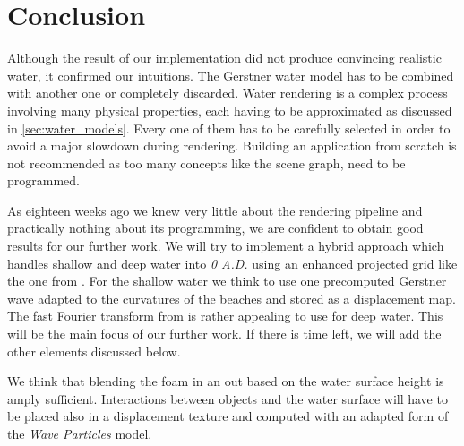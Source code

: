\section{Conclusion}\label{sec:conclusion}


Although the result of our implementation did not produce convincing realistic
water, it confirmed our intuitions. The Gerstner water model has to be combined
with another one or completely discarded. Water rendering is a complex process
involving many physical properties, each having to be approximated as discussed
in \autoref{sec:water_models}. Every one of them has to be carefully selected in
order to avoid a major slowdown during rendering. Building an application from
scratch is not recommended as too many concepts like the scene graph, need to be
programmed.

As eighteen weeks ago we knew very little about the rendering pipeline and
practically nothing about its programming, we are confident to obtain good
results for our further work. We will try to implement a hybrid approach which
handles shallow and deep water into \textit{0 A.D.} using an enhanced projected
grid like the one from \autocite{kryachko2016sea}.  For the shallow water we
think to use one precomputed Gerstner wave adapted to the curvatures of the
beaches and stored as a displacement map. The fast Fourier transform from
\autocite{tessendorf2001simulating} is rather appealing to use for deep water.
This will be the main focus of our further work. If there is time left, we will
add the other elements discussed below.

We think that blending the foam in an out based on the water surface height is
amply sufficient. Interactions between objects and the water surface will have
to be placed also in a displacement texture and computed with an adapted form of
the \textit{Wave Particles} model.
